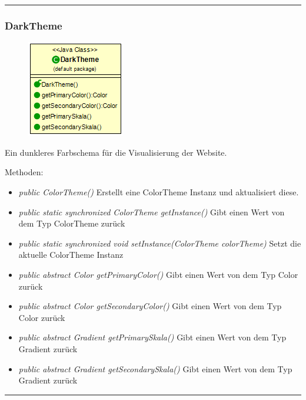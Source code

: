 \rule{\textwidth}{0.4pt}
\subsubsection{DarkTheme}
\begin{minipage}{0.3\textwidth}
    \begin{figure}[H]
        {\centering\includegraphics[scale = 0.5
        ]{media/view/theme/DarkTheme_Class.png}}
    \end{figure}
    \end{minipage} \hfill
    \begin{minipage}{0.6\textwidth}
       Ein dunkleres Farbschema für die Visualisierung der Website.
    \end{minipage}
Methoden: \begin{itemize} [noitemsep]
    \item \emph{public ColorTheme()} Erstellt eine ColorTheme Instanz und aktualisiert diese.
    \item \emph{public static synchronized ColorTheme getInstance()} Gibt einen Wert von dem Typ ColorTheme zurück
    \item \emph{public static synchronized void setInstance(ColorTheme colorTheme)} Setzt die aktuelle ColorTheme Instanz
    \item \emph{public abstract Color getPrimaryColor()} Gibt einen Wert von dem Typ Color zurück
    \item \emph{public abstract Color getSecondaryColor()} Gibt einen Wert von dem Typ Color zurück
    \item \emph{public abstract Gradient getPrimarySkala()} Gibt einen Wert von dem Typ Gradient zurück
    \item \emph{public abstract Gradient getSecondarySkala()}  Gibt einen Wert von dem Typ Gradient zurück
\end{itemize}

\rule{\textwidth}{0.4pt}
